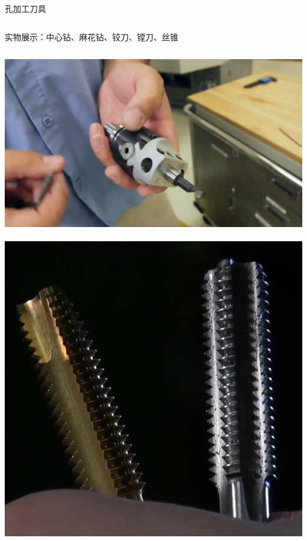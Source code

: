 \documentclass[utf8,zihao=-4,handout,smaller,aspectratio=1610]{ctexbeamer}
\begin{document}
\begin{frame}{孔加工刀具}
	\begin{columns}
		\column{\textwidth}
		
		实物展示：中心钻、麻花钻、铰刀、镗刀、丝锥

		
	\end{columns}

\includegraphics[width=.5\linewidth,trim=0 0 0  0,clip,angle=0]{image/4}~
\includegraphics[width=0.5\linewidth,trim=0 0 0 0,clip,angle=0]{image/sizui.jpg}~
\end{frame}
\end{document}
